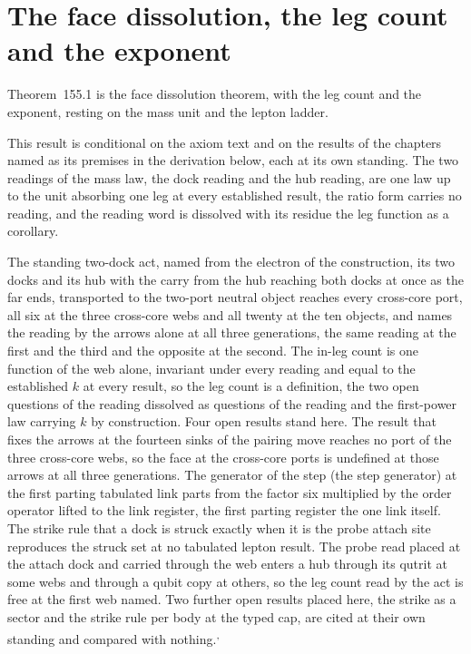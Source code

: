 \section{The face dissolution, the leg count and the exponent}\label{mod:V-11-face-dissolution-the-leg-count-and-the-exponent}
\label{narr:open:5-11}Theorem~155.1 is the face dissolution theorem, with the leg count and the exponent, resting on the mass unit and the lepton ladder.
\begin{chconditional}\label{box:V-11-face-dissolution-the-leg-count-and-the-exponent:1}
This result is conditional on the axiom text and on the results of the chapters named as its premises in the derivation below, each at its own standing.
The two readings of the mass law, the dock reading and the hub reading, are one law up to the unit absorbing one leg at every established result, the ratio form carries no reading, and the reading word is dissolved with its residue the leg function as a corollary.
\end{chconditional}
The standing two-dock act, named from the electron of the construction, its two docks and its hub with the carry from the hub reaching both docks at once as the far ends, transported to the two-port neutral object reaches every cross-core port, all six at the three cross-core webs and all twenty at the ten objects, and names the reading by the arrows alone at all three generations, the same reading at the first and the third and the opposite at the second.
The in-leg count is one function of the web alone, invariant under every reading and equal to the established $k$ at every result, so the leg count is a definition, the two open questions of the reading dissolved as questions of the reading and the first-power law carrying $k$ by construction.
Four open results stand here. The result that fixes the arrows at the fourteen sinks of the pairing move reaches no port of the three cross-core webs, so the face at the cross-core ports is undefined at those arrows at all three generations. The generator of the step (the step generator) at the first parting tabulated link parts from the factor six multiplied by the order operator lifted to the link register, the first parting register the one link itself. The strike rule that a dock is struck exactly when it is the probe attach site reproduces the struck set at no tabulated lepton result. The probe read placed at the attach dock and carried through the web enters a hub through its qutrit at some webs and through a qubit copy at others, so the leg count read by the act is free at the first web named. Two further open results placed here, the strike as a sector and the strike rule per body at the typed cap, are cited at their own standing and compared with nothing.\textsuperscript{,}
